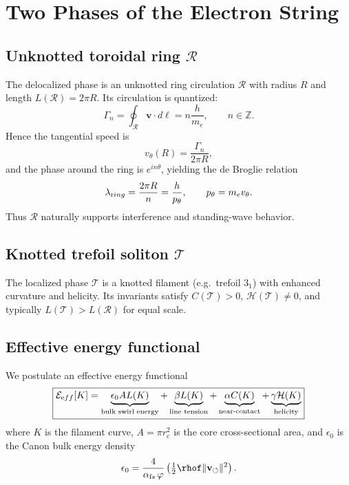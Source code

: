 \documentclass[11pt,a4paper]{article}
\begin{document}
\section{Two Phases of the Electron String}

    \subsection{Unknotted toroidal ring $\mathcal{R}$}

        The delocalized phase is an unknotted ring circulation $\mathcal{R}$ with radius $R$ and length $L(\mathcal{R})=2\pi R$. Its circulation is quantized:
\begin{equation}
            \Gamma_n = \oint_{\mathcal{R}} \mathbf{v} \cdot d\boldsymbol{\ell} = n \frac{h}{m_e}, \qquad n\in \mathbb{Z} .
\end{equation}
Hence the tangential speed is
\begin{equation}
    v_\theta(R) = \frac{\Gamma_n}{2\pi R},
\end{equation}
        and the phase around the ring is $e^{i n\theta}$, yielding the de Broglie relation
\begin{equation}
    \lambda_{\textrm ring} = \frac{2\pi R}{n} = \frac{h}{p_\theta}, \qquad p_\theta = m_e v_\theta .
\end{equation}
        Thus $\mathcal{R}$ naturally supports interference and standing-wave behavior.

    \subsection{Knotted trefoil soliton $\mathcal{T}$}

        The localized phase $\mathcal{T}$ is a knotted filament (e.g.\ trefoil $3_1$) with enhanced curvature and helicity. Its invariants satisfy $C(\mathcal{T})>0$, $\mathcal{H}(\mathcal{T})\neq 0$, and typically $L(\mathcal{T})>L(\mathcal{R})$ for equal scale.

\subsection{Effective energy functional}

We postulate an effective energy functional
\begin{equation}
    \boxed{
        \mathcal{E}_{\textrm eff}[K] =
        \underbrace{\epsilon_0 A L(K)}_{\text{bulk swirl energy}} +
        \underbrace{\beta L(K)}_{\text{line tension}} +
        \underbrace{\alpha C(K)}_{\text{near-contact}} +
        \underbrace{\gamma \mathcal{H}(K)}_{\text{helicity}}
    }
\end{equation}
        where $K$ is the filament curve, $A=\pi r_c^2$ is the core cross-sectional area, and $\epsilon_0$ is the Canon bulk energy density
\begin{equation}
            \epsilon_0 = \frac{4}{\alpha_{\textrm fs}\,\varphi}\left(\tfrac12 \rhof \|\mathbf{v}_{\circlearrowleft}\|^2\right).
\end{equation}
\end{document}
